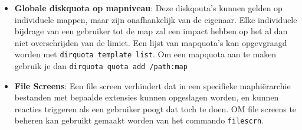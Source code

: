 \begin{enumerate}
{\begin{itemize}
\begin{itemize}
						\item \textbf{Globale diskquota op mapniveau}: Deze diskqouta's kunnen gelden op individuele mappen, maar zijn onafhankelijk van de eigenaar. Elke individuele bijdrage van een gebruiker tot de map zal een impact hebben op het al dan niet overschrijden van de limiet. Een lijst van mapquota's kan opgevgraagd worden met \texttt{dirquota template list}. Om een mapquota aan te maken gebruik je dan \texttt{dirquota quota add /path:map}
						\item \textbf{File Screens}: Een file screen verhindert dat in een specifieke maphiërarchie bestanden met bepaalde extensies kunnen opgeslagen worden, en kunnen reacties triggeren als een gebruiker poogt dat toch te doen. OM file screens te beheren kan gebruikt gemaakt worden van het commando \texttt{filescrn}. 
					\end{itemize}
				
				
			\end{itemize}
		}
	\end{enumerate}
	
